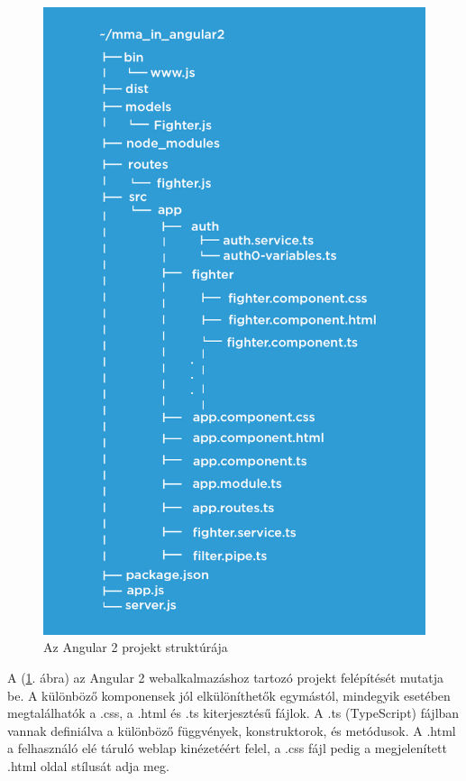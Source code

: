 \begin{figure}[htb]
\centering
\includegraphics[scale=0.7]{kepek/mma_in_angular2.jpeg}
\caption{Az Angular 2 projekt struktúrája}
\label{fig:angular2_structure}
\end{figure}

A (\ref{fig:angular2_structure}. ábra) az Angular 2 webalkalmazáshoz tartozó projekt felépítését mutatja be. A különböző komponensek jól elkülöníthetők egymástól, mindegyik esetében megtalálhatók a .css, a .html és .ts kiterjesztésű fájlok. A .ts (TypeScript) fájlban vannak definiálva a különböző függvények, konstruktorok, és metódusok. A .html a felhasználó elé táruló weblap kinézetéért felel, a .css fájl pedig a megjelenített .html oldal stílusát adja meg. \cite{Angular 2 könyv} \cite{Angular 2 oldal} 